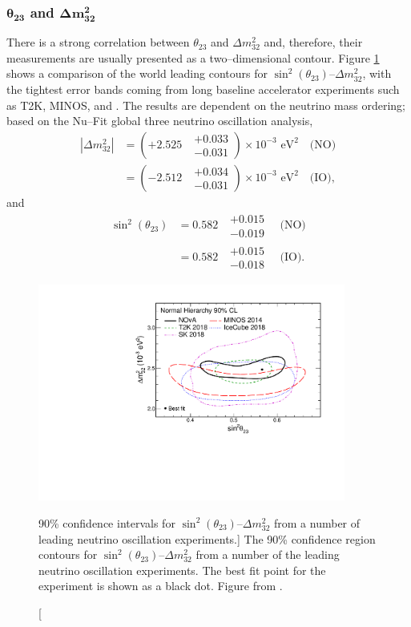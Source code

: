 \subsubsection*{$\boldsymbol{\theta_{23}}$ and $\boldsymbol{\Delta m^2_{32}}$}

There is a strong correlation between $\theta_{23}$ and $\Delta m^2_{32}$ and,
therefore, their measurements are usually presented as a two--dimensional
contour. Figure \ref{fig:delm_sin23} shows a comparison of the world leading
contours for $\sin^2 (\theta_{23})$--$\Delta m^2_{32}$, with the tightest error
bands coming from long baseline accelerator experiments such as T2K, MINOS, and 
\nova{}\cite{PhysRevD.96.092006, PhysRevLett.112.191801, PhysRevLett.123.151803}. 
The results are dependent on the neutrino mass ordering; based on the Nu--Fit 
global three neutrino oscillation analysis\cite{Esteban:2018azc}, 
\begin{align*}
	|\Delta m^2_{32}| &= (+ 2.525 \mbox{ } \substack{+ 0.033 \\ - 0.031}) \times 10^{-3} \mbox{  eV}^2 \quad \mbox{(NO)} \\
	                  &= (- 2.512 \mbox{ } \substack{+ 0.034 \\ - 0.031}) \times 10^{-3} \mbox{  eV}^2 \quad \mbox{(IO)},
\end{align*}
and 
\begin{align*}
	\sin^2(\theta_{23}) &= 0.582 \mbox{  } \substack{+ 0.015 \\ - 0.019} \quad \mbox{(NO)} \nonumber \\
	                    &= 0.582 \mbox{  } \substack{+ 0.015 \\ - 0.018} \quad \mbox{(IO)}.
\end{align*}

\begin{figure}
	\centering
	\includegraphics[width=0.9\textwidth]{figures/theta23_msquare.pdf}
	\caption 
	[90\% confidence intervals for $\sin^2 (\theta_{23})$--$\Delta m^2_{32}$ from
	a number of leading neutrino oscillation experiments.]
	{The 90\% confidence region contours for 
	$\sin^2 (\theta_{23})$--$\Delta m^2_{32}$ from a number of the leading 
	neutrino oscillation experiments\cite{PhysRevD.96.092006, PhysRevLett.112.191801, PhysRevLett.123.151803}. 
	The best fit point for the \nova{} experiment is shown as a black dot.  
	Figure from \cite{PhysRevLett.123.151803}.}
	\label{fig:delm_sin23}
\end{figure}

